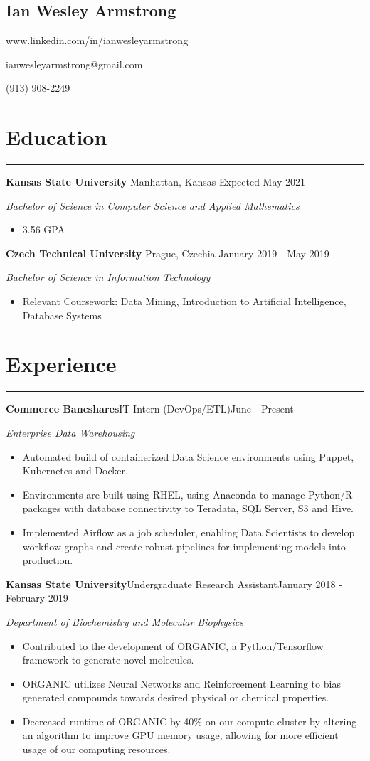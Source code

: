 \documentclass[11pt]{article}
\newcommand{\name}[1]{\begin{center}\section*{\huge #1}\end{center}}
\newcommand{\topinfo}[1]{\begin{center}\vspace{-0.2cm}#1\vspace{-0.2cm}\end{center}}
\newcommand{\resumesection}[1]{\vspace{-0.2cm}\section*{#1}\vspace{-0.2cm}\hrule\vspace{0.2cm}}
\begin{document}
\name{Ian Wesley Armstrong}
\topinfo{www.linkedin.com/in/ianwesleyarmstrong}
\topinfo{ianwesleyarmstrong@gmail.com}
\topinfo{(913) 908-2249}

\resumesection{Education}
\textbf{Kansas State University} \hfill Manhattan, Kansas \hfill Expected May 2021  

\textit{Bachelor of Science in Computer Science and Applied Mathematics}
\begin{itemize}
	\item 3.56 GPA
\end{itemize}

\textbf{Czech Technical University} \hfill Prague, Czechia \hfill January 2019 - May 2019 

\textit{Bachelor of Science in Information Technology }
\begin{itemize}
	\item Relevant Coursework: Data Mining, Introduction to Artificial Intelligence, Database Systems
\end{itemize}

\resumesection{Experience}
\textbf{Commerce Bancshares}\hfill{IT Intern (DevOps/ETL)}\hfill{June - Present} 

\textit{Enterprise Data Warehousing}
\begin{itemize}
	\item Automated build of containerized Data Science environments using Puppet, Kubernetes and Docker.
	\item Environments are built using RHEL, using Anaconda to manage Python/R packages with database connectivity to Teradata, SQL Server, S3 and Hive.
	\item Implemented Airflow as a job scheduler, enabling Data Scientists to develop workflow graphs and create robust pipelines for implementing models into production.
\end{itemize}

\textbf{Kansas State University}\hfill{Undergraduate Research Assistant}\hfill{January 2018 - February 2019} 

\textit{Department of Biochemistry and Molecular Biophysics}
\begin{itemize}
	\item Contributed to the development of ORGANIC, a Python/Tensorflow framework to generate novel molecules. 
	\item ORGANIC utilizes Neural Networks and Reinforcement Learning to bias generated compounds towards desired physical or chemical properties.
	\item Decreased runtime of ORGANIC by 40\% on our compute cluster by altering an algorithm to improve GPU memory usage, allowing for more efficient usage of our computing resources.
\end{itemize}
\end{document}
